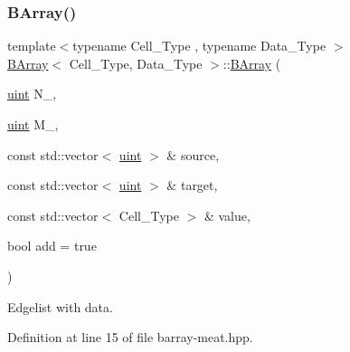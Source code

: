 \subsubsection{\texorpdfstring{B\+Array()}{BArray()}\hspace{0.1cm}{\footnotesize\ttfamily [3/5]}}
{\footnotesize\ttfamily template$<$typename Cell\+\_\+\+Type , typename Data\+\_\+\+Type $>$ \\
\hyperlink{class_b_array}{B\+Array}$<$ Cell\+\_\+\+Type, Data\+\_\+\+Type $>$\+::\hyperlink{class_b_array}{B\+Array} (\begin{DoxyParamCaption}\item[{\hyperlink{typedefs_8hpp_a91ad9478d81a7aaf2593e8d9c3d06a14}{uint}}]{N\+\_\+,  }\item[{\hyperlink{typedefs_8hpp_a91ad9478d81a7aaf2593e8d9c3d06a14}{uint}}]{M\+\_\+,  }\item[{const std\+::vector$<$ \hyperlink{typedefs_8hpp_a91ad9478d81a7aaf2593e8d9c3d06a14}{uint} $>$ \&}]{source,  }\item[{const std\+::vector$<$ \hyperlink{typedefs_8hpp_a91ad9478d81a7aaf2593e8d9c3d06a14}{uint} $>$ \&}]{target,  }\item[{const std\+::vector$<$ Cell\+\_\+\+Type $>$ \&}]{value,  }\item[{bool}]{add = {\ttfamily true} }\end{DoxyParamCaption})\hspace{0.3cm}{\ttfamily [inline]}}



Edgelist with data. 



Definition at line 15 of file barray-\/meat.\+hpp.

\mbox{\label{class_b_array_aa5f13f86c045a1f9c39b9a7df4126c78}} 
